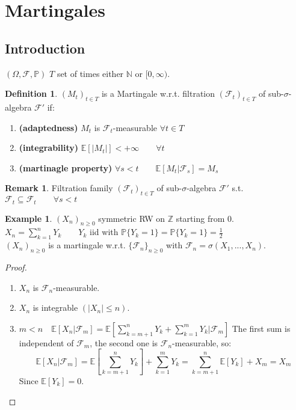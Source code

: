 \documentclass[10pt,a4paper]{article}
\theoremstyle{definition}
\newtheorem{defi}{Definition}[section]
\newtheorem{exi}{Example}[section]
\newtheorem*{rem}{Remark}
\begin{document}
\section{Martingales}
\subsection{Introduction}
$ (\Omega,\mathcal{F},\mathbb{P}) $ $T$ set of times either $\mathbb{N}$ or $[0,\infty)$.
\begin{defi}
	$(M_t)_{t\in T}$ is a Martingale w.r.t. filtration $(\mathcal{F}_t)_{t\in T}$ of sub-$\sigma$-algebra   $\mathcal{F}'$ if:
	\begin{enumerate}
		\item \textbf{(adaptedness)} $M_t$ is $\mathcal{F}_t$-measurable $\forall t\in T$
		\item \textbf{(integrability)} $\mathbb{E}[|M_t|]<+\infty \qquad\forall t$
		\item \textbf{(martinagle property)} $\forall s<t \qquad \mathbb{E}[M_t|\mathcal{F}_s]=M_s$
	\end{enumerate}
\begin{rem}
	Filtration family $(\mathcal{F}_t)_{t\in T}$ of sub-$\sigma$-algebra   $\mathcal{F}'$ s.t. $\mathcal{F}_t\subseteq\mathcal{F}_t \qquad \forall s<t$
\end{rem}
\end{defi}
\begin{exi}
	$(X_n)_{n\geq0}$ symmetric RW on $\mathbb{Z}$ starting from $0$.\\
	$X_n=\sum_{k=1}^{n}Y_k \qquad Y_k$ iid with $\mathbb{P}\{Y_k=1\}=\mathbb{P}\{Y_k=1\}=\frac{1}{2}$ \\
	$(X_n)_{n\geq0}$ is a martingale w.r.t. $\{\mathcal{F}_n\}_{n\geq0}$ with $\mathcal{F}_n=\sigma(X_1,...,X_n)$.
\end{exi}
\begin{proof}
	\begin{enumerate}
		\item $X_n$ is $\mathcal{F}_n$-measurable.
		\item $X_n$ is integrable $(|X_n|\leq n)$.
		\item $m<n \quad \mathbb{E}[X_n|\mathcal{F}_m]=\mathbb{E}[\sum_{k=m+1}^{n}Y_k+\sum_{k=1}^{m}Y_k|\mathcal{F}_m]$
		The first sum is independent of $\mathcal{F}_m$, the second one is $\mathcal{F}_n$-measurable, so:
		\begin{equation*}
			\mathbb{E}[X_n|\mathcal{F}_m]=\mathbb{E}[\sum_{k=m+1}^{n}Y_k]+\sum_{k=1}^{m}Y_k=\sum_{k=m+1}^{n}\mathbb{E}[Y_k]+X_m=X_m
		\end{equation*}
	Since $\mathbb{E}[Y_k]=0$.
	\end{enumerate}
\end{proof}
\end{document}
